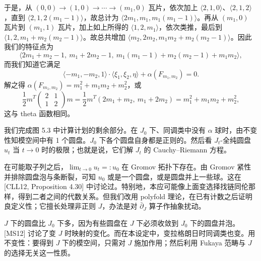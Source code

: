 于是，从 $(0,0)\to(1,0)\to\cdots\to(m_1,0)$ 瓦片，依次加上 $\langle2,1,0\rangle$、$\langle2,1,2\rangle$，直到 $\langle2,1,2(m_1-1)\rangle$，故总计为 $\langle2m_1,m_1,m_1(m_1-1)\rangle$。再从 $(m_1,0)$ 瓦片到 $(m_1,1)$ 瓦片，加上如上所得的 $\langle1,2,m_1\rangle$，依次类推，最后到 $\langle1,2,m_1+m_2(m_2-1)\rangle$。故总共增加 $\langle m_2,2m_2,m_1m_2+m_2(m_2-1)\rangle$。因此我们的特征点为
\[
\langle2m_1+m_2-1,\ m_1+2m_2-1,\ m_1(m_1-1)+m_2(m_2-1)+m_1m_2\rangle,
\]
而我们知道它满足
\[
\langle-m_1,-m_2,1\rangle\cdot\langle\xi_1,\xi_2,\eta\rangle+\alpha(F_{m_1,m_2})=0.
\]
解之得 $\alpha(F_{m_1,m_2})=m_1^2+m_1m_2+m_2^2$，或
\[
\frac12 m^T\begin{pmatrix}2&1\\1&2\end{pmatrix}m
=\frac12 m^T(2m_1+m_2,\ m_1+2m_2)
=m_1^2+m_1m_2+m_2^2,
\]
这与 theta 函数相同。


\begin{remark}\label{rem:finish-plan}
我们完成图 5.3 中计算计划的剩余部分。在 $J_0$ 下、同调类中没有 $\alpha$ 球时，由不变性知模空间中有 1 个圆盘。$J_0$ 下各个圆盘自身都是正则的。然后看 $J_t$-全纯圆盘 $u_t$ 当 $t\to0$ 时的极限；也就是说，它们解 $J_t$ 的 Cauchy--Riemann 方程。
\end{remark}

在可能取子列之后，$\lim_{t\to0}u_t=:u_0$ 在 Gromov 拓扑下存在。由 Gromov 紧性并排除圆盘泡与条断裂，可知 $u_0$ 或是一个圆盘，或是圆盘并上一些球。这在 [CLL12, Proposition 4.30] 中讨论过。特别地，本应可能像上面变选择找链同伦那样，得到二者之间的代数关系。但我们改用 polyfold 理论，在已有计数之后证明良定义性；它擅长处理非正则 $J$，办法是对 $\bar\partial_J$ 算子作抽象扰动。

\begin{remark}\label{rem:more-discs}
$J$ 下的圆盘比 $J_0$ 下多，因为有些圆盘在 $J$ 下必须收敛到 $J_0$ 下的圆盘并泡。[MS12] 讨论了变 $J$ 时映射的变化。而在本设定中，变拉格朗日时同调类也变。用不变性：要得到 $J$ 下的模空间，只需对 $J$ 施加作用；然后利用 Fukaya 范畴与 $J$ 的选择无关这一性质。
\end{remark}


